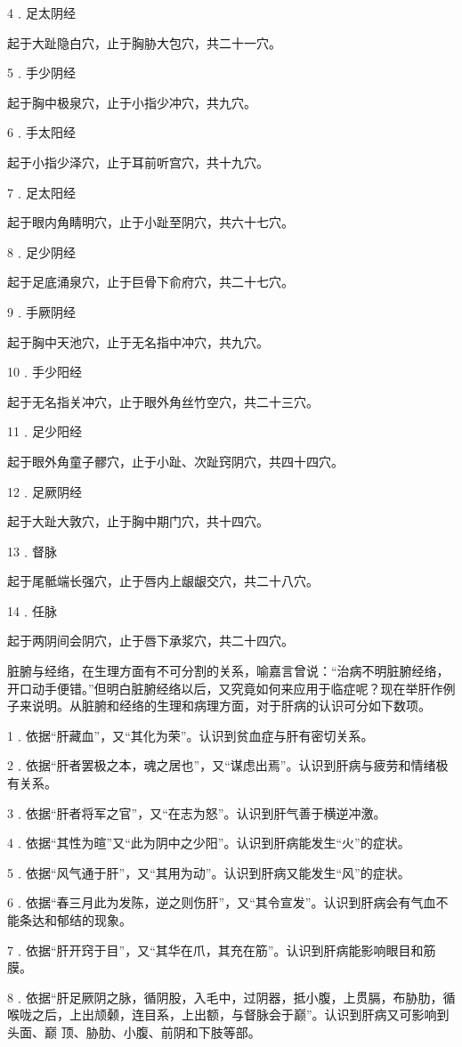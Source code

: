 \documentclass[12pt,UTF8]{ctexbook}
\begin{document}
4﹒足太阴经

起于大趾隐白穴，止于胸胁大包穴，共二十一穴。

5﹒手少阴经

起于胸中极泉穴，止于小指少冲穴，共九穴。

6﹒手太阳经

起于小指少泽穴，止于耳前听宫穴，共十九穴。

7﹒足太阳经

起于眼内角睛明穴，止于小趾至阴穴，共六十七穴。

8﹒足少阴经

起于足底涌泉穴，止于巨骨下俞府穴，共二十七穴。

9﹒手厥阴经

起于胸中天池穴，止于无名指中冲穴，共九穴。

10﹒手少阳经

起于无名指关冲穴，止于眼外角丝竹空穴，共二十三穴。

11﹒足少阳经

起于眼外角童子髎穴，止于小趾、次趾窍阴穴，共四十四穴。

12﹒足厥阴经

起于大趾大敦穴，止于胸中期门穴，共十四穴。

13﹒督脉

起于尾骶端长强穴，止于唇内上龈龈交穴，共二十八穴。

14﹒任脉

起于两阴间会阴穴，止于唇下承浆穴，共二十四穴。

脏腑与经络，在生理方面有不可分割的关系，喻嘉言曾说：“治病不明脏腑经络，开口动手便错。”但明白脏腑经络以后，又究竟如何来应用于临症呢？现在举肝作例子来说明。从脏腑和经络的生理和病理方面，对于肝病的认识可分如下数项。

1﹒依据“肝藏血”，又“其化为荣”。认识到贫血症与肝有密切关系。

2﹒依据“肝者罢极之本，魂之居也”，又“谋虑出焉”。认识到肝病与疲劳和情绪极有关系。

3﹒依据“肝者将军之官”，又“在志为怒”。认识到肝气善于横逆冲激。

4﹒依据“其性为暄”又“此为阴中之少阳”。认识到肝病能发生“火”的症状。

5﹒依据“风气通于肝”，又“其用为动”。认识到肝病又能发生“风”的症状。

6﹒依据“春三月此为发陈，逆之则伤肝”，又“其令宣发”。认识到肝病会有气血不能条达和郁结的现象。

7﹒依据“肝开窍于目”，又“其华在爪，其充在筋”。认识到肝病能影响眼目和筋膜。

8﹒依据“肝足厥阴之脉，循阴股，入毛中，过阴器，抵小腹，上贯膈，布胁肋，循喉咙之后，上出颃颡，连目系，上出额，与督脉会于巅”。认识到肝病又可影响到头面、巅
顶、胁肋、小腹、前阴和下肢等部。
\end{document}
